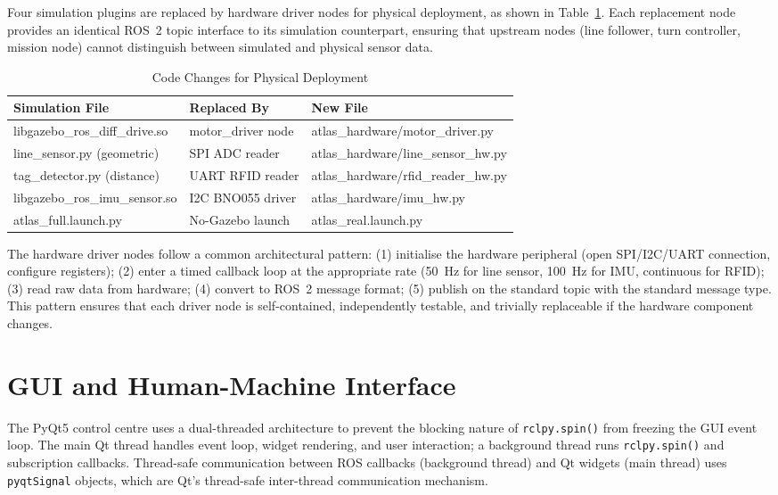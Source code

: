 \documentclass[12pt,a4paper,oneside]{report}
\begin{document}
Four simulation plugins are replaced by hardware driver nodes for physical deployment, as shown in Table~\ref{tab:code_changes}. Each replacement node provides an identical ROS~2 topic interface to its simulation counterpart, ensuring that upstream nodes (line follower, turn controller, mission node) cannot distinguish between simulated and physical sensor data.

\begin{table}[H]
\centering
\caption{Code Changes for Physical Deployment}
\label{tab:code_changes}
\begin{tabular}{p{3.5cm} p{3.5cm} p{4cm}}
\toprule
\textbf{Simulation File} & \textbf{Replaced By} & \textbf{New File} \\
\midrule
libgazebo\_ros\_diff\_drive.so & motor\_driver node & atlas\_hardware/motor\_driver.py \\
line\_sensor.py (geometric) & SPI ADC reader & atlas\_hardware/line\_sensor\_hw.py \\
tag\_detector.py (distance) & UART RFID reader & atlas\_hardware/rfid\_reader\_hw.py \\
libgazebo\_ros\_imu\_sensor.so & I2C BNO055 driver & atlas\_hardware/imu\_hw.py \\
atlas\_full.launch.py & No-Gazebo launch & atlas\_real.launch.py \\
\bottomrule
\end{tabular}
\end{table}

The hardware driver nodes follow a common architectural pattern: (1) initialise the hardware peripheral (open SPI/I2C/UART connection, configure registers); (2) enter a timed callback loop at the appropriate rate (50~Hz for line sensor, 100~Hz for IMU, continuous for RFID); (3) read raw data from hardware; (4) convert to ROS~2 message format; (5) publish on the standard topic with the standard message type. This pattern ensures that each driver node is self-contained, independently testable, and trivially replaceable if the hardware component changes.

\section{GUI and Human-Machine Interface}

The PyQt5 control centre uses a dual-threaded architecture to prevent the blocking nature of \texttt{rclpy.spin()} from freezing the GUI event loop. The main Qt thread handles event loop, widget rendering, and user interaction; a background thread runs \texttt{rclpy.spin()} and subscription callbacks. Thread-safe communication between ROS callbacks (background thread) and Qt widgets (main thread) uses \texttt{pyqtSignal} objects, which are Qt's thread-safe inter-thread communication mechanism.
\end{document}
